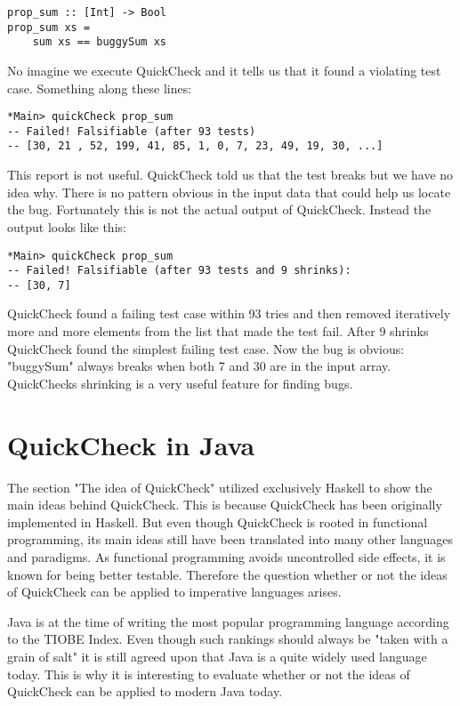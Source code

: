 \documentclass[a4paper, 12pt]{article} %
\begin{document}
\begin{verbatim}
prop_sum :: [Int] -> Bool
prop_sum xs = 
    sum xs == buggySum xs
\end{verbatim}

No imagine we execute QuickCheck and it tells us that it found a violating test case. Something along these lines:

\begin{verbatim}
*Main> quickCheck prop_sum
-- Failed! Falsifiable (after 93 tests)
-- [30, 21 , 52, 199, 41, 85, 1, 0, 7, 23, 49, 19, 30, ...]
\end{verbatim}

This report is not useful. QuickCheck told us that the test breaks but we have no idea why. There is no pattern obvious in the input data that could help us locate the bug. Fortunately this is not the actual output of QuickCheck. Instead the output looks like this:

\begin{verbatim}
*Main> quickCheck prop_sum
-- Failed! Falsifiable (after 93 tests and 9 shrinks):
-- [30, 7]
\end{verbatim}

QuickCheck found a failing test case within 93 tries and then removed iteratively more and more elements from the list that made the test fail. After 9 shrinks QuickCheck found the simplest failing test case. Now the bug is obvious: "buggySum" always breaks when both 7 and 30 are in the input array. QuickChecks shrinking is a very useful feature for finding bugs.

\newpage
\section{QuickCheck in Java}

The section "The idea of QuickCheck" utilized exclusively Haskell to show the main ideas behind QuickCheck. This is because QuickCheck has been originally implemented in Haskell. But even though QuickCheck is rooted in functional programming, its main ideas still have been translated into many other languages and paradigms. As functional programming avoids uncontrolled side effects, it is known for being better testable. Therefore the question whether or not the ideas of QuickCheck can be applied to imperative languages arises. 

Java is at the time of writing the most popular programming language according to the TIOBE Index. \cite{tiobe2018} Even though such rankings should always be "taken with a grain of salt" it is still agreed upon that Java is a quite widely used language today. This is why it is interesting to evaluate whether or not the ideas of QuickCheck can be applied to modern Java today.
\end{document}
